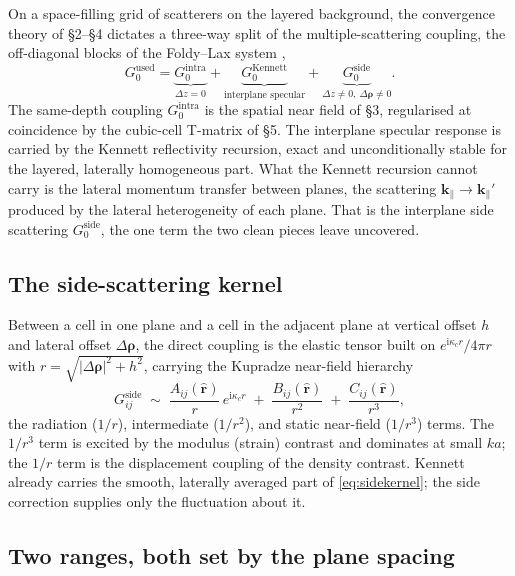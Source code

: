 \documentclass[11pt,a4paper]{article}
\newcommand{\ii}{\mathrm{i}}
\newcommand{\kpar}{\mathbf{k}_{\parallel}}
\newcommand{\brho}{\boldsymbol{\rho}}
\begin{document}
On a space-filling grid of scatterers on the layered background, the convergence theory of
\S2--\S4 dictates a three-way split of the multiple-scattering coupling, the off-diagonal
blocks of the Foldy--Lax system \cite{Foldy1945,Lax1951},
\begin{equation}
\label{eq:split}
G_0^{\text{used}}
=\underbrace{G_0^{\text{intra}}}_{\Delta z=0}
+\underbrace{G_0^{\text{Kennett}}}_{\text{interplane specular}}
+\underbrace{G_0^{\text{side}}}_{\Delta z\neq 0,\ \Delta\brho\neq 0}.
\end{equation}
The same-depth coupling $G_0^{\text{intra}}$ is the spatial near field of \S3, regularised at
coincidence by the cubic-cell T-matrix of \S5. The interplane specular response is carried by
the Kennett reflectivity recursion, exact and unconditionally stable for the layered,
laterally homogeneous part. What the Kennett recursion cannot carry is the lateral momentum
transfer between planes, the scattering $\kpar\to\kpar'$ produced by the lateral heterogeneity
of each plane. That is the interplane side scattering $G_0^{\text{side}}$, the one term the two
clean pieces leave uncovered.

\subsection{The side-scattering kernel}

Between a cell in one plane and a cell in the adjacent plane at vertical offset $h$ and lateral
offset $\Delta\brho$, the direct coupling is the elastic tensor built on $e^{\ii\kappa_c r}/4\pi
r$ with $r=\sqrt{|\Delta\brho|^2+h^2}$, carrying the Kupradze near-field hierarchy
\begin{equation}
\label{eq:sidekernel}
G^{\text{side}}_{ij}\;\sim\;
\frac{A_{ij}(\hat{\mathbf r})}{r}\,e^{\ii\kappa_c r}
\;+\;\frac{B_{ij}(\hat{\mathbf r})}{r^{2}}
\;+\;\frac{C_{ij}(\hat{\mathbf r})}{r^{3}},
\end{equation}
the radiation ($1/r$), intermediate ($1/r^{2}$), and static near-field ($1/r^{3}$) terms. The
$1/r^{3}$ term is excited by the modulus (strain) contrast and dominates at small $ka$; the
$1/r$ term is the displacement coupling of the density contrast. Kennett already carries the
smooth, laterally averaged part of \eqref{eq:sidekernel}; the side correction supplies only the
fluctuation about it.

\subsection{Two ranges, both set by the plane spacing}
\end{document}
